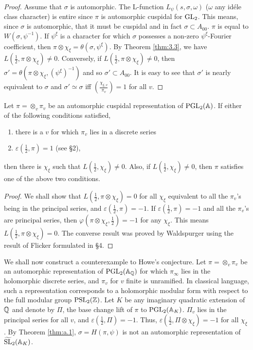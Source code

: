 \begin{appendices}
\begin{proof}
Assume that $\sigma$ is automorphic.
The L-function $L_\psi(s, \sigma,\omega)$ ($\omega$ any id\'ele class character) is entire since $\pi$ is automorphic cuspidal for $\mathrm{GL}_2$.
This means, since $\sigma$ is automorphic, that it must be cuspidal and in fact $\sigma \subset A_{00}$.
$\pi$ is equal to $W(\sigma, \psi^{-1})$.
If $\psi^\xi$ is a character for which $\sigma$ possesses a non-zero $\psi^\xi$-Fourier coefficient, then $\pi \otimes \chi_\xi = \theta(\sigma, \psi^\xi)$.
By Theorem \ref{thm:3.3}, we have $L(\frac{1}{2}, \pi \otimes \chi_\xi) \neq 0$.
Conversely, if $L(\frac{1}{2}, \pi \otimes \chi_\xi) \neq 0$, then $\sigma' = \theta(\pi \otimes \chi_\xi, (\psi^\xi)^{-1})$ and so $\sigma' \subset A_{00}$.
It is easy to see that $\sigma'$ is nearly equivalent to $\sigma$ and $\sigma' \simeq \sigma$ iff $\left(\frac{\chi_{\xi, v}}{\pi_v}\right) = 1$ for all $v$.
\end{proof}

\begin{theorem}
\label{thm:a.2}
Let $\pi = \otimes_v \pi_v$ be an automorphic cuspidal representation of $\mathrm{PGL}_2(\mathbb{A})$.
If either of the following conditions satisfied,
\begin{enumerate}[label=(\roman*)]
    \item there is a $v$ for which $\pi_v$ lies in a discrete series
    \item $\varepsilon(\frac{1}{2}, \pi) = 1$ (see \S 2),
\end{enumerate}
then there is $\chi_\xi$ such that $L(\frac{1}{2},\chi_\xi) \neq 0$.
Also, if $L(\frac{1}{2}, \chi_\xi) \neq 0$, then $\pi$ satisfies one of the above two conditions.
\end{theorem}
\begin{proof}
We shall show that $L(\frac{1}{2}, \pi \otimes \chi_\xi) = 0$ for all $\chi_\xi$ equivalent to all the $\pi_v$'s being in the principal series, and $\varepsilon(\frac{1}{2}, \pi) = -1$.
If $\varepsilon(\frac{1}{2}, \pi) = -1$ and all the $\pi_v$'s are principal series, then $\varphi(\pi \otimes \chi_\xi, \frac{1}{2}) = -1$ for any $\chi_\xi$.
This means $L(\frac{1}{2}, \pi \otimes \chi_\xi) = 0$.
The converse result was proved by Waldspurger using the result of Flicker \cite{flicker80covering} formulated in \S 4.
\end{proof}

We shall now construct a counterexample to Howe's conjecture.
Let $\pi = \otimes_v \pi_v$ be an automorphic representation of $\mathrm{PGL}_2(\mathbb{A}_{\mathbb{Q}})$ for which $\pi_\infty$ lies in the holomorphic discrete series, and $\pi_v$ for $v$ finite is unramified.
In classical language, such a representation corresponds to a holomorphic modular form with respect to the full modular group $\mathrm{PSL}_2(\mathbb{Z})$.
Let $K$ be any imaginary quadratic extension of $\mathbb{Q}$ and denote by $\Pi$, the base change lift of $\pi$ to $\mathrm{PGL}_2(\mathbb{A}_K)$.
$\Pi_v$ lies in the principal series for all $v$, and $\varepsilon(\frac{1}{2}, \Pi) = -1$.
Thus, $\varepsilon(\frac{1}{2}, \Pi \otimes \chi_\xi) =-1$ for all $\chi_\xi$.
By Theorem \ref{thm:a.1}, $\sigma = H(\pi, \psi)$ is not an automorphic representation of $\widetilde{\mathrm{SL}}_2(\mathbb{A}_K)$.



\end{appendices}
